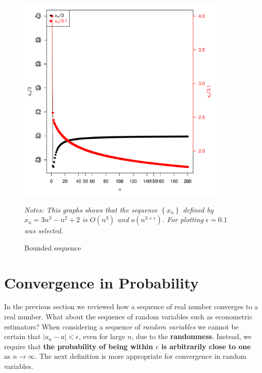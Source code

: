 \begin{figure}[ht]
  \caption{Bounded sequence}
    \label{fig:SeqConvBond}
    \centering
    \begin{minipage}{.9\linewidth}
\begin{knitrout}
\color{fgcolor}

{\centering \includegraphics[width=10cm,height=10cm]{figure/SeqConvBoun-1} 

}


\end{knitrout}
\footnotesize
		\emph{Notes: This graphs shows that the sequence $\left\lbrace x_n\right\rbrace$ defined by $x_n = 3n^3 - n^2 + 2$ is $O(n^3)$ and $o(n^{3 + \epsilon})$. For plotting $\epsilon = 0.1$ was selected.}
	\end{minipage}
\end{figure}


\section{Convergence in Probability}

In the previous section we reviewed how a sequence of real number converges to a real number.  What about the sequence of random variables such as econometric estimators? When considering a sequence of \emph{random variables} we cannot be certain that $\left| a_n - a\right|<\epsilon$, even for large $n$, due to the \textbf{randomness}. Instead, we require that \textbf{the probability of being within $\epsilon$ is arbitrarily close to one} as $n\to \infty$. The next definition is more appropriate for convergence in random variables. 

